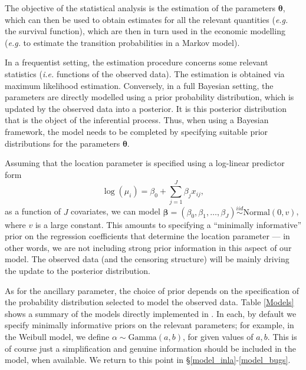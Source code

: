 \documentclass[article,nojss]{jss}
\newcommand{\ie}{{\em i.e.\/}\xspace}
\newcommand{\eg}{{\em e.g.\/}\xspace}
\newcommand{\sh}{\proglang{survHE}\xspace}
\begin{document}
The objective of the statistical analysis is the estimation of the parameters $\bm\theta$, which can then be used to obtain estimates for all the relevant quantities (\eg the survival function), which are then in turn used in the economic modelling (\eg to estimate the transition probabilities in a Markov model).

In a frequentist setting, the estimation procedure concerns some relevant statistics (\ie functions of the observed data). The estimation is obtained via maximum likelihood estimation. Conversely, in a full Bayesian setting, the parameters are directly modelled using a prior probability distribution, which is updated by the observed data into a posterior. It is this posterior distribution that is the object of the inferential process. Thus, when using a Bayesian framework, the model needs to be completed by specifying suitable prior distributions for the parameters $\bm\theta$.

Assuming that the location parameter is specified using a log-linear predictor form
\[\log(\mu_i) = \beta_0 + \sum_{j=1}^J \beta_j x_{ij}, \]
as a function of $J$ covariates, we can model $\bm\beta = (\beta_0,\beta_1,\ldots,\beta_J) \stackrel{iid}{\sim}\mbox{Normal}(0,v)$, where $v$ is a large constant. This amounts to specifying a ``minimally informative'' prior on the regression coefficients that determine the location parameter --- in other words, we are not including strong prior information in this aspect of our model. The observed data (and the censoring structure) will be mainly driving the update to the posterior distribution. 

As for the ancillary parameter, the choice of prior depends on the specification of the probability distribution selected to model the observed data. Table \ref{Models} shows a summary of the models directly implemented in \sh. In each, by default we specify minimally informative priors on the relevant parameters; for example, in the Weibull model, we define $\alpha\sim\mbox{Gamma}(a,b)$, for given values of $a,b$. This is of course just a simplification and genuine information should be included in the model, when available. We return to this point in \S\ref{model_inla}-\ref{model_bugs}.
\end{document}
